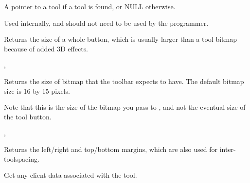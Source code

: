 

A pointer to a tool if a tool is found, or NULL otherwise.


Used internally, and should not need to be used by the programmer.

\label{wxtoolbargettoolsize}


Returns the size of a whole button, which is usually larger than a tool bitmap because
of added 3D effects.


,\rtfsp
{}

\label{wxtoolbargettoolbitmapsize}


Returns the size of bitmap that the toolbar expects to have. The default bitmap size is 16 by 15 pixels.


Note that this is the size of the bitmap you pass to ,
and not the eventual size of the tool button.


,\rtfsp
{}

\label{wxtoolbargetmargins}


Returns the left/right and top/bottom margins, which are also used for inter-toolspacing.



\label{wxtoolbargettoolclientdata}


Get any client data associated with the tool.



